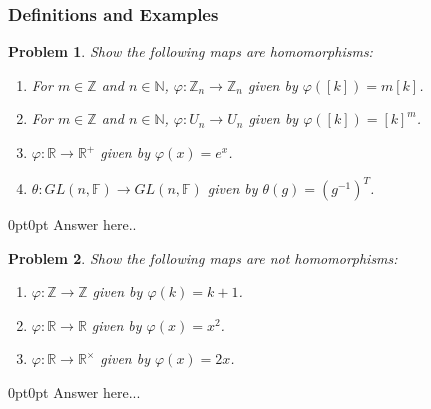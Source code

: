 \documentclass[12pt]{article}
\newcommand{\Z}{\mathbb{Z}}
\newcommand{\R}{\mathbb{R}}
\newcommand{\F}{\mathbb{F}}
\newcommand{\N}{\mathbb{N}}
\newtheorem{problem}{Problem}
\numberwithin{problem}{section} %
\theoremstyle{remark}  %
\newenvironment{answer}
    {\begin{adjustwidth}{0pt}{0pt}}
    {\end{adjustwidth}}
\begin{document}
\subsubsection{Definitions and Examples}
\setcounter{problem}{91}
    \begin{problem}
        Show the following maps are homomorphisms:
        \begin{enumerate}[label=(\alph*)]
            \item For $m\in\Z$ and $n\in\N$, $\varphi \operatorname{:} \Z_n \to \Z_n$ given by $\varphi([k])=m[k]$.
            \item For $m\in\Z$ and $n\in\N$, $\varphi\operatorname{:}U_n \to U_n$ given by $\varphi([k])=[k]^m$.
            \item $\varphi\operatorname{:}\R\to\R^+$ given by $\varphi(x)=e^x$.
            \item $\theta\operatorname{:}GL(n,\F)\to GL(n,\F)$ given by $\theta(g)=(g^{-1})^T$.
        \end{enumerate}
    \end{problem}
    \begin{answer}
        Answer here..
    \end{answer}
    \begin{problem}
        Show the following maps are not homomorphisms:
        \begin{enumerate}[label=(\alph*)]
            \item $\varphi\operatorname{:}\Z\to\Z$ given by $\varphi(k)=k+1$.
            \item $\varphi\operatorname{:}\R\to\R$ given by $\varphi(x)=x^2$.
            \item $\varphi\operatorname{:}\R\to\R^\times$ given by $\varphi(x)=2x$.
        \end{enumerate}
    \end{problem}
    \begin{answer}
        Answer here...
    \end{answer}
\end{document}
